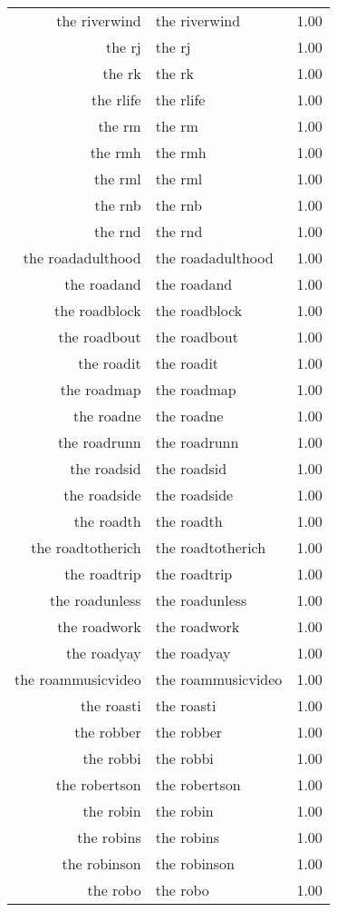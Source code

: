 \begin{table}[ht]
\begin{tabular}{rlr}
  the riverwind & the riverwind & 1.00 \\ 
  the rj & the rj & 1.00 \\ 
  the rk & the rk & 1.00 \\ 
  the rlife & the rlife & 1.00 \\ 
  the rm & the rm & 1.00 \\ 
  the rmh & the rmh & 1.00 \\ 
  the rml & the rml & 1.00 \\ 
  the rnb & the rnb & 1.00 \\ 
  the rnd & the rnd & 1.00 \\ 
  the roadadulthood & the roadadulthood & 1.00 \\ 
  the roadand & the roadand & 1.00 \\ 
  the roadblock & the roadblock & 1.00 \\ 
  the roadbout & the roadbout & 1.00 \\ 
  the roadit & the roadit & 1.00 \\ 
  the roadmap & the roadmap & 1.00 \\ 
  the roadne & the roadne & 1.00 \\ 
  the roadrunn & the roadrunn & 1.00 \\ 
  the roadsid & the roadsid & 1.00 \\ 
  the roadside & the roadside & 1.00 \\ 
  the roadth & the roadth & 1.00 \\ 
  the roadtotherich & the roadtotherich & 1.00 \\ 
  the roadtrip & the roadtrip & 1.00 \\ 
  the roadunless & the roadunless & 1.00 \\ 
  the roadwork & the roadwork & 1.00 \\ 
  the roadyay & the roadyay & 1.00 \\ 
  the roammusicvideo & the roammusicvideo & 1.00 \\ 
  the roasti & the roasti & 1.00 \\ 
  the robber & the robber & 1.00 \\ 
  the robbi & the robbi & 1.00 \\ 
  the robertson & the robertson & 1.00 \\ 
  the robin & the robin & 1.00 \\ 
  the robins & the robins & 1.00 \\ 
  the robinson & the robinson & 1.00 \\ 
  the robo & the robo & 1.00 \\ 

\end{tabular}
\end{table}
